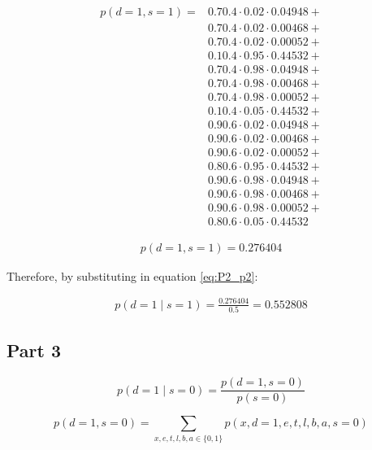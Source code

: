 \documentclass[12pt]{report}
\begin{document}
\begin{align*}    
    p(d=1 , s = 1) = 
    &0.7 0.4 \cdot  0.02 \cdot 0.04948  + \\
    &0.7 0.4 \cdot  0.02 \cdot 0.00468  + \\
    &0.7 0.4 \cdot  0.02 \cdot 0.00052  + \\
    &0.1 0.4 \cdot  0.95 \cdot 0.44532  + \\
    &0.7 0.4 \cdot  0.98 \cdot 0.04948  + \\
    &0.7 0.4 \cdot  0.98 \cdot 0.00468  + \\
    &0.7 0.4 \cdot  0.98 \cdot 0.00052  + \\
    &0.1 0.4 \cdot  0.05 \cdot 0.44532  + \\  
    &0.9  0.6 \cdot  0.02 \cdot 0.04948  + \\
    &0.9  0.6 \cdot  0.02 \cdot 0.00468  + \\
    &0.9  0.6 \cdot  0.02 \cdot 0.00052  + \\
    &0.8  0.6 \cdot  0.95 \cdot 0.44532  + \\
    &0.9  0.6 \cdot  0.98 \cdot 0.04948  + \\
    &0.9  0.6 \cdot  0.98 \cdot 0.00468  + \\
    &0.9  0.6 \cdot  0.98 \cdot 0.00052  + \\
    &0.8  0.6 \cdot  0.05 \cdot 0.44532
\end{align*}

\begin{align*}
    p(d=1, s = 1) = 0.276404
\end{align*}


Therefore, by substituting in equation \eqref{eq:P2_p2}:

\begin{align*}
    p(d=1 \mid s = 1) = \frac{0.276404}{0.5} = 0.552808
\end{align*}

\subsection*{Part 3}

\begin{equation} \label{eq:P2_p3}
    p(d=1 \mid s = 0) = \frac{p(d=1 , s = 0)}{p(s=0)}
\end{equation}

\begin{equation}
    p(d=1 , s = 0) = \sum_{x,e,t,l,b,a \in \{0,1\}} p(x,d=1,e,t,l,b,a,s=0)
\end{equation}
\end{document}
